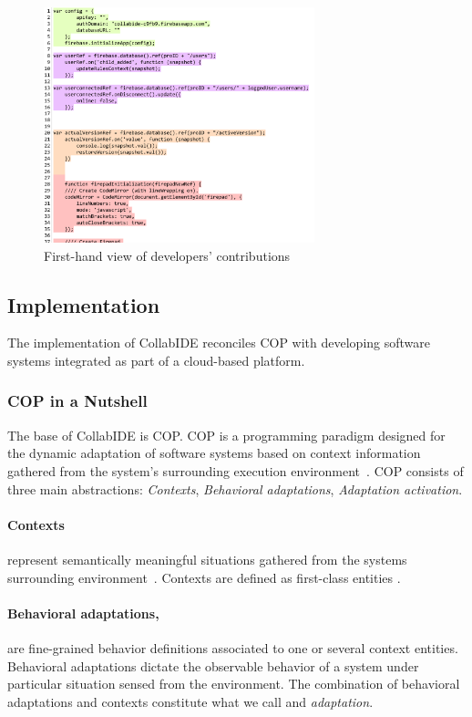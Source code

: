 \begin{figure}[htbp]
  \centering
  \includegraphics[width=0.7\textwidth]{img/fig2-collabIDEConcurrentProgramming}
  \caption{First-hand view of developers' contributions}
  \label{fig:layers}
\end{figure}


\subsection{Implementation}
\label{sec:implementation}

The implementation of CollabIDE reconciles \ac{COP} with developing software systems integrated as part of a cloud-based platform.

\subsubsection{\ac{COP} in a Nutshell}
The base of CollabIDE is \acf{COP}. \ac{COP} is a programming paradigm designed for the dynamic adaptation of software systems based on context information gathered from the system's surrounding execution environment~\cite{salvaneschi+12survey}. \ac{COP} consists of three main abstractions: \emph{Contexts}, \emph{Behavioral adaptations}, \emph{Adaptation activation}.

\paragraph{Contexts} represent semantically meaningful situations gathered from the systems surrounding environment~\cite{dey01}. Contexts are defined as first-class entities .

\paragraph{Behavioral adaptations,} are fine-grained behavior definitions associated to one or several context entities. Behavioral adaptations dictate the observable behavior of a system under particular situation sensed from the environment. The combination of behavioral adaptations and contexts constitute what we call and \emph{adaptation}.

